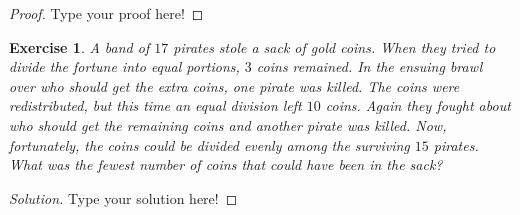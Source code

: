 \documentclass[12pt,leqno]{article}
\numberwithin{equation}{section}
\newtheorem{exer}[thm]{Exercise}
\theoremstyle{definition}
\begin{document}
\begin{proof}[Proof]
Type your proof here!
\end{proof}




\begin{exer}
A band of $17$ pirates stole a sack of gold coins.  When they tried
to divide the fortune into equal portions, $3$ coins remained.  In
the ensuing brawl over who should get the extra coins, one pirate
was killed.  The coins were redistributed, but this time an equal
division left $10$ coins.  Again they fought about who should get
the remaining coins and another pirate was killed.  Now,
fortunately, the coins could be divided evenly among the surviving
$15$ pirates.  What was the fewest number of coins that could have
been in the sack?
\end{exer}

\begin{proof}[Solution]
Type your solution here!
\end{proof}
\end{document}
